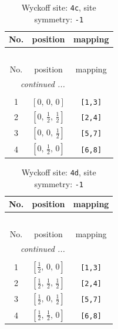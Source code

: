 \documentclass[fleqn,8pt]{jsarticle}
\begin{document}
\renewcommand{\arraystretch}{1.2}
\begin{longtable}{ccc}
\caption{Wyckoff site: {\tt 4c}, site symmetry: {\tt -1}}
 \\
 \hline \hline
No. & position & mapping \\ \hline \endfirsthead

\multicolumn{2}{l}{\tablename\ \thetable{}} \\
 \hline \hline
No. & position & mapping \\ \hline \endhead

 \hline \hline
\multicolumn{2}{r}{\footnotesize\it continued ...} \\ \endfoot

 \hline \hline
\multicolumn{2}{r}{} \\ \endlastfoot

1 & $\left[ 0,\, 0,\, 0 \right]$ & {\tt [1,3]} \\ \hline
2 & $\left[ 0,\, \frac{1}{2},\, \frac{1}{2} \right]$ & {\tt [2,4]} \\ \hline
3 & $\left[ 0,\, 0,\, \frac{1}{2} \right]$ & {\tt [5,7]} \\ \hline
4 & $\left[ 0,\, \frac{1}{2},\, 0 \right]$ & {\tt [6,8]} \\
\end{longtable}
\renewcommand{\arraystretch}{1.2}
\begin{longtable}{ccc}
\caption{Wyckoff site: {\tt 4d}, site symmetry: {\tt -1}}
 \\
 \hline \hline
No. & position & mapping \\ \hline \endfirsthead

\multicolumn{2}{l}{\tablename\ \thetable{}} \\
 \hline \hline
No. & position & mapping \\ \hline \endhead

 \hline \hline
\multicolumn{2}{r}{\footnotesize\it continued ...} \\ \endfoot

 \hline \hline
\multicolumn{2}{r}{} \\ \endlastfoot

1 & $\left[ \frac{1}{2},\, 0,\, 0 \right]$ & {\tt [1,3]} \\ \hline
2 & $\left[ \frac{1}{2},\, \frac{1}{2},\, \frac{1}{2} \right]$ & {\tt [2,4]} \\ \hline
3 & $\left[ \frac{1}{2},\, 0,\, \frac{1}{2} \right]$ & {\tt [5,7]} \\ \hline
4 & $\left[ \frac{1}{2},\, \frac{1}{2},\, 0 \right]$ & {\tt [6,8]} \\
\end{longtable}
\end{document}

